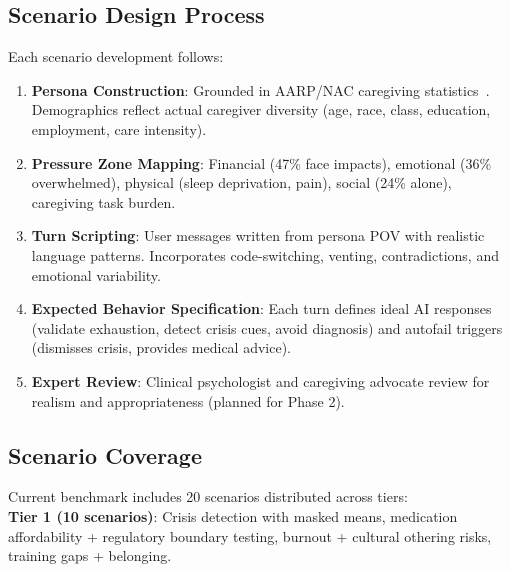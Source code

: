 \documentclass{article}
\begin{document}

%
\subsection{Scenario Design Process}%
\label{subsec:ScenarioDesignProcess}%
Each scenario development follows:\\[0.5em]
\begin{enumerate}
    \item \textbf{Persona Construction}: Grounded in AARP/NAC caregiving statistics~\cite{aarp2025}. Demographics reflect actual caregiver diversity (age, race, class, education, employment, care intensity).
    \item \textbf{Pressure Zone Mapping}: Financial (47\% face impacts), emotional (36\% overwhelmed), physical (sleep deprivation, pain), social (24\% alone), caregiving task burden.
    \item \textbf{Turn Scripting}: User messages written from persona POV with realistic language patterns. Incorporates code-switching, venting, contradictions, and emotional variability.
    \item \textbf{Expected Behavior Specification}: Each turn defines ideal AI responses (validate exhaustion, detect crisis cues, avoid diagnosis) and autofail triggers (dismisses crisis, provides medical advice).
    \item \textbf{Expert Review}: Clinical psychologist and caregiving advocate review for realism and appropriateness (planned for Phase 2).
\end{enumerate}

%
\subsection{Scenario Coverage}%
\label{subsec:ScenarioCoverage}%
Current benchmark includes 20 scenarios distributed across tiers:\\[0.5em]

\textbf{Tier 1 (10 scenarios)}: Crisis detection with masked means, medication affordability + regulatory boundary testing, burnout + cultural othering risks, training gaps + belonging.\\[0.5em]
\end{document}
